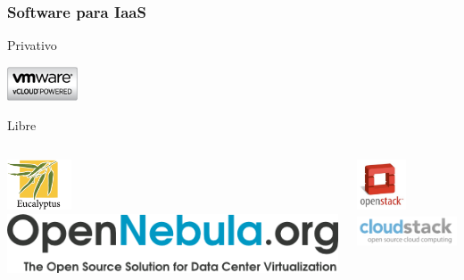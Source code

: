 \documentclass{beamer}
\begin{document}
\begin{frame}
  \frametitle{Software para IaaS}
  \begin{description}
  \item[Privativo]
  \end{description}
  \begin{center}
    \includegraphics[height=1cm]{../img/vcloud.png}
  \end{center}
  \begin{description}
  \item[Libre]
  \end{description}
  \begin{columns}
    \begin{center}
      \includegraphics[height=1.5cm]{../img/eucalyptus.png}\\
      \vspace{.5cm}
      \includegraphics[height=.75cm]{../img/opennebula.png}
    \end{center}
    \begin{center}
      \includegraphics[height=1.5cm]{../img/openstack.jpg}\\
      \vspace{.5cm}
      \includegraphics[height=1cm]{../img/cloudstack.png}      
    \end{center}
  \end{columns}
\end{frame}
\end{document}

